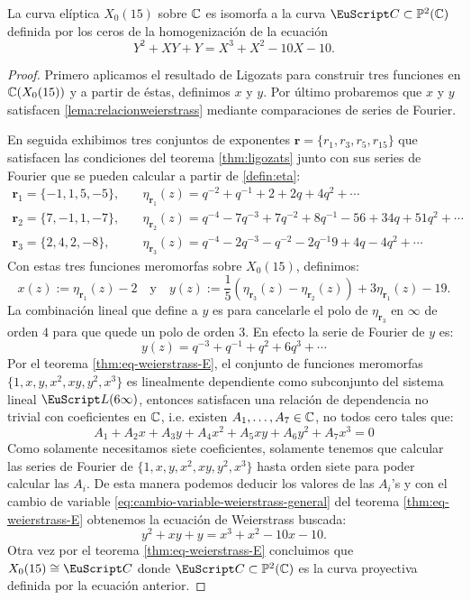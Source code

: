 \documentclass[../../tesis_maestria]{subfiles}
\begin{document}
\begin{lema}\label{lema:eqweierstrassX_0(15)}
	La curva elíptica $X_0(15)$ sobre $\mathbb{C}$ es isomorfa a la curva $\Cc\subset\PP^2(\CC)$ definida por los ceros de la homogenización de la ecuación
	\begin{equation}\label{lema:relacionweierstrass}
		Y^2+XY+Y=X^3+X^2-10X-10.
	\end{equation}
\end{lema}
\begin{proof}
Primero aplicamos el resultado de Ligozats para construir tres funciones en $\mathbb{C}(X_0(15))$ y a partir de éstas, definimos $x$ y $y$. Por último probaremos que $x$ y $y$ satisfacen \eqref{lema:relacionweierstrass} mediante comparaciones de series de Fourier.

En seguida exhibimos tres conjuntos de exponentes $\mathbf{r}=\{r_1,r_3,r_5,r_{15}\}$ que satisfacen las condiciones del teorema \ref{thm:ligozats} junto con sus series de Fourier que se pueden calcular a partir de \eqref{defin:eta}:
\begin{align*}
	\mathbf{r}_1=\{-1,1,5,-5\},\quad& \eta_{\mathbf{r}_1}(z)=q^{-2}+q^{-1}+2+2q+4q^2+\cdots\\
	\mathbf{r}_2=\{7,-1,1,-7\},\quad& \eta_{\mathbf{r}_2}(z)=q^{-4}-7q^{-3}+7q^{-2}+8q^{-1}-56+34q+51q^2+\cdots\\
	\mathbf{r}_3=\{2,4,2,-8\},\quad&  \eta_{\mathbf{r}_3}(z)=q^{-4}-2q^{-3}-q^{-2}-2q^{-1}9+4q-4q^2+\cdots
\end{align*}
Con estas tres funciones meromorfas sobre $X_0(15)$, definimos:
\[
	x(z):=\eta_{\mathbf{r}_1}(z)-2
	\quad\text{y}\quad
	y(z):=\frac{1}{5}(\eta_{\mathbf{r}_3}(z)-\eta_{\mathbf{r}_2}(z))+3\eta_{\mathbf{r}_1}(z)-19.
\]
La combinación lineal que define a $y$ es para cancelarle el polo de $\eta_{\mathbf{r}_3}$ en $\infty$ de orden $4$ para que quede un polo de orden 3.  En efecto la serie de Fourier de $y$ es:
\[
	y(z)=q^{-3}+q^{-1}+q^2+6q^3+\cdots
\]
 Por el teorema \ref{thm:eq-weierstrass-E}, el conjunto de funciones meromorfas $\{1,x,y,x^2,xy,y^2,x^3\}$ es linealmente dependiente como subconjunto del sistema lineal $\Ll(6\infty)$, entonces satisfacen una relación de dependencia no trivial con coeficientes en $\mathbb{C}$, i.e. existen $A_1,\ldots,A_7\in\mathbb{C}$, no todos cero tales que:
 \[
 A_1+A_2x+A_3y+A_4x^2+A_5xy+A_6y^2+A_7x^3=0
 \]
Como solamente necesitamos siete coeficientes, solamente tenemos que calcular las series de Fourier de $\{1,x,y,x^2,xy,y^2,x^3\}$ hasta orden siete para poder calcular las $A_i$. De esta manera podemos deducir los valores de las $A_i$'s y con el cambio de variable \eqref{eq:cambio-variable-weierstrass-general} del teorema \ref{thm:eq-weierstrass-E} obtenemos la ecuación de Weierstrass buscada:
	\[
		y^2+xy+y=x^3+x^2-10x-10.	
	\]
Otra vez por el teorema \ref{thm:eq-weierstrass-E} concluimos que $X_0(15)\cong\Cc$ donde $\Cc\subset\PP^2(\CC)$ es la curva proyectiva definida por la ecuación anterior.
\end{proof}
\end{document}
